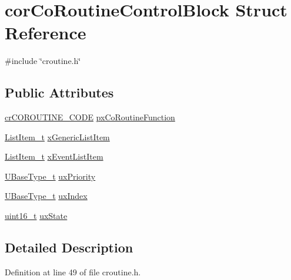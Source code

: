 \hypertarget{structcorCoRoutineControlBlock}{}\section{cor\+Co\+Routine\+Control\+Block Struct Reference}
\label{structcorCoRoutineControlBlock}


{\ttfamily \#include \char`\"{}croutine.\+h\char`\"{}}

\subsection*{Public Attributes}
\begin{DoxyCompactItemize}
\item 
\hyperlink{croutine_8h_a397a7505718dd366d8411ce324c49758}{cr\+C\+O\+R\+O\+U\+T\+I\+N\+E\+\_\+\+C\+O\+DE} \hyperlink{structcorCoRoutineControlBlock_acc98c7364cd88e8e034a5f9bba113832}{px\+Co\+Routine\+Function}
\item 
\hyperlink{list_8h_a1a62d469392f9bfe2443e7efab9c8398}{List\+Item\+\_\+t} \hyperlink{structcorCoRoutineControlBlock_aa2900494db8782eeb8ef12d482501406}{x\+Generic\+List\+Item}
\item 
\hyperlink{list_8h_a1a62d469392f9bfe2443e7efab9c8398}{List\+Item\+\_\+t} \hyperlink{structcorCoRoutineControlBlock_a105d316da0069f766acc3b210afed1b9}{x\+Event\+List\+Item}
\item 
\hyperlink{pic32mx_2portmacro_8h_a646f89d4298e4f5afd522202b11cb2e6}{U\+Base\+Type\+\_\+t} \hyperlink{structcorCoRoutineControlBlock_a752101a5d41b5caa7fd5149436613c8f}{ux\+Priority}
\item 
\hyperlink{pic32mx_2portmacro_8h_a646f89d4298e4f5afd522202b11cb2e6}{U\+Base\+Type\+\_\+t} \hyperlink{structcorCoRoutineControlBlock_a6c185cd2145f562fb570bea9b158fc81}{ux\+Index}
\item 
\hyperlink{stdint_8h_a273cf69d639a59973b6019625df33e30}{uint16\+\_\+t} \hyperlink{structcorCoRoutineControlBlock_aa0d702ff5a23c61598fe13e5a78fb1dc}{ux\+State}
\end{DoxyCompactItemize}


\subsection{Detailed Description}


Definition at line 49 of file croutine.\+h.




